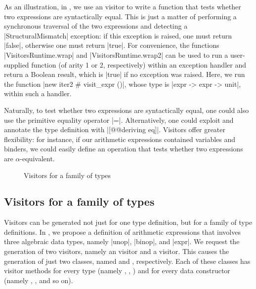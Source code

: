\documentclass[11pt,a4paper,twoside]{article}
\begin{document}
As an illustration, in , we use an \itertwo visitor to write
a function that tests whether two expressions are syntactically equal. This is
just a matter of performing a synchronous traversal of the two expressions and
detecting a \oc|StructuralMismatch| exception: if this exception is raised,
one must return \oc|false|, otherwise one must return \oc|true|. For
convenience, the functions \oc|VisitorsRuntime.wrap| and
\oc|VisitorsRuntime.wrap2| can be used to run a user-supplied function (of
arity 1 or 2, respectively) within an exception handler and return a Boolean
result, which is \oc|true| if no exception was raised. Here, we run the
function
%
\oc|new iter2 # visit_expr ()|, whose type is \oc|expr -> expr -> unit|,
within such a handler.

Naturally, to test whether two expressions are syntactically equal, one could
also use the primitive equality operator \oc|=|. Alternatively, one could
exploit \ppxderiving and annotate the type definition with
%
\oc|[@@deriving eq]|. Visitors offer greater flexibility: for instance, if our
arithmetic expressions contained variables and binders, we could easily define
an operation that tests whether two expressions are $\alpha$-equivalent.


\begin{figure}[p]
\caption{Visitors for a family of types}
\label{fig:expr06}
\end{figure}

\subsection{Visitors for a family of types}
\label{sec:intro:family}

Visitors can be generated not just for one type definition, but for a family
of type definitions. In , we propose a definition of
arithmetic expressions that involves three algebraic data types, namely
\oc|unop|, \oc|binop|, and \oc|expr|. We request the generation of two
visitors, namely an \iter visitor and a \map visitor. This causes the
generation of just two classes, named \iter and \map, respectively. Each of
these classes has visitor methods for every type (namely ,
, ) and for every data constructor
(namely , , and so on).
\end{document}
